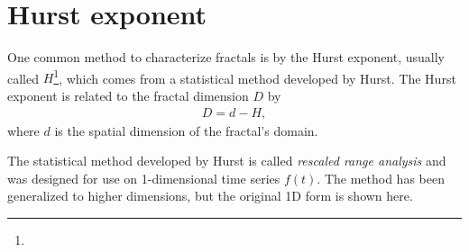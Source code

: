 \section{Hurst exponent}

One common method to characterize fractals is by the Hurst exponent, usually called $H$\footnote{}, which comes from a statistical method developed by Hurst\cite{hurst1965longterm}\cite{hurst1951longterm}. The Hurst exponent is related to the fractal dimension $D$ by
\begin{align*}
    D = d-H,
\end{align*}
where $d$ is the spatial dimension of the fractal's domain\cite{feder1988fractals}.

The statistical method developed by Hurst is called \emph{rescaled range analysis} and was designed for use on 1-dimensional time series $f(t)$. The method has been generalized to higher dimensions\cite{fan2013rescaled}, but the original 1D form is shown here.


